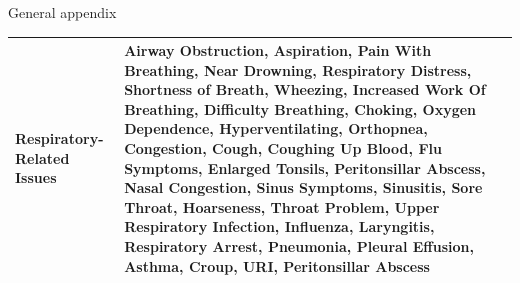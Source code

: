 \documentclass[,,nonblindrev]{informs}
\begin{document}
\begin{APPENDIX}{General appendix}
\begin{longtable}{|p{5cm}|p{12cm}|}
\hline
Respiratory-Related Issues & Airway Obstruction, Aspiration, Pain With Breathing, Near Drowning, Respiratory Distress, Shortness of Breath, Wheezing, Increased Work Of Breathing, Difficulty Breathing, Choking, Oxygen Dependence, Hyperventilating, Orthopnea, Congestion, Cough, Coughing Up Blood, Flu Symptoms, Enlarged Tonsils, Peritonsillar Abscess, Nasal Congestion, Sinus Symptoms, Sinusitis, Sore Throat, Hoarseness, Throat Problem, Upper Respiratory Infection, Influenza, Laryngitis, Respiratory Arrest, Pneumonia, Pleural Effusion, Asthma, Croup, URI, Peritonsillar Abscess\\
\hline
\end{longtable}

\end{APPENDIX}

%
%
%





\end{document}
